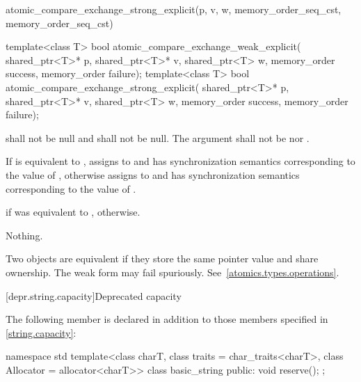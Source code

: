 \begin{itemdescr}
\pnum
\returns
\begin{codeblock}
atomic_compare_exchange_strong_explicit(p, v, w, memory_order_seq_cst, memory_order_seq_cst)
\end{codeblock}
\end{itemdescr}

%
%
\begin{itemdecl}
template<class T>
  bool atomic_compare_exchange_weak_explicit(
    shared_ptr<T>* p, shared_ptr<T>* v, shared_ptr<T> w,
    memory_order success, memory_order failure);
template<class T>
  bool atomic_compare_exchange_strong_explicit(
    shared_ptr<T>* p, shared_ptr<T>* v, shared_ptr<T> w,
    memory_order success, memory_order failure);
\end{itemdecl}

\begin{itemdescr}
\pnum
\requires {} shall not be null and  shall not be null.
The  argument shall not be  nor
.

\pnum
\effects
If  is equivalent to , assigns  to
 and has synchronization semantics corresponding to the value of
, otherwise assigns  to  and has
synchronization semantics corresponding to the value of .

\pnum
\returns
{} if  was equivalent to ,  otherwise.

\pnum
\throws
Nothing.

\pnum
\remarks
Two  objects are equivalent if they store the same
pointer value and share ownership.
The weak form may fail spuriously. See~\ref{atomics.types.operations}.
\end{itemdescr}

[depr.string.capacity]{Deprecated  capacity}

\pnum
The following member is declared in addition to those members specified
in \ref{string.capacity}:

%
\begin{codeblock}
namespace std {
  template<class charT, class traits = char_traits<charT>,
           class Allocator = allocator<charT>>
  class basic_string {
  public:
    void reserve();
  };
}
\end{codeblock}

